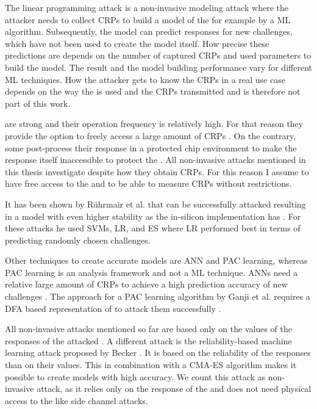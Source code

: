The linear programming attack is a non-invasive modeling attack where the attacker needs to collect \acp{CRP} to build a model of the \puf for example by a \ac{ML} algorithm.
Subsequently, the model can predict responses for new challenges, which have not been used to create the model itself.
How precise these predictions are depends on the number of captured \acp{CRP} and used parameters to build the model. %
The result and the model building performance vary for different \ac{ML} techniques.
How the attacker gets to know the \acp{CRP} in a real use case depends on the way the \puf is used and the \acp{CRP} transmitted and is therefore not part of this work. %

\apufs are strong \pufs and their operation frequency is relatively high.
For that reason they provide the option to freely access a large amount of \acp{CRP} \cite{Ruhrmair2010ModelingFunctions}. %
On the contrary, some \pufs post-process their response in a protected chip environment to make the \puf response itself inaccessible to protect the \puf \cite{Suh2007PhysicalGeneration, Gassend2004IdentificationCircuits}.
All non-invasive attacks mentioned in this thesis investigate \pufs despite how they obtain \acp{CRP}.
For this reason I assume to have free access to the \puf and to be able to measure \acp{CRP} without restrictions.

It has been shown by Rührmair et al. that \apufs can be successfully attacked resulting in a model with even higher stability as the \apuf in-silicon implementation has \cite{Ruhrmair2010ModelingFunctions}.
For these attacks he used \acp{SVM}, \ac{LR}, and \ac{ES} where \ac{LR} performed best in terms of predicting randomly chosen challenges. %

Other techniques to create accurate \apuf models are \ac{ANN} and \ac{PAC} learning, whereas \ac{PAC} learning is an analysis framework and not a \ac{ML} technique. %
\acp{ANN} need a relative large amount of \acp{CRP} to achieve a high prediction accuracy of new challenges \cite{Hospodar2012MachineUsability}.
The approach for a \ac{PAC} learning algorithm by Ganji et al. requires a \ac{DFA} based representation of \apufs to attack them successfully \cite{Ganji2016PACPUFs}.

All non-invasive attacks mentioned so far are based only on the values of the responses of the attacked \puf.
A different attack is the reliability-based machine learning attack proposed by Becker \cite{Becker2015ThePUFs}. %
It is based on the reliability of the \puf responses than on their values. 
This in combination with a \ac{CMA-ES} algorithm makes it possible to create \apuf models with high accuracy.
We count this attack as non-invasive attack, as it relies only on the response of the \puf and does not need physical access to the \puf like side channel attacks.

